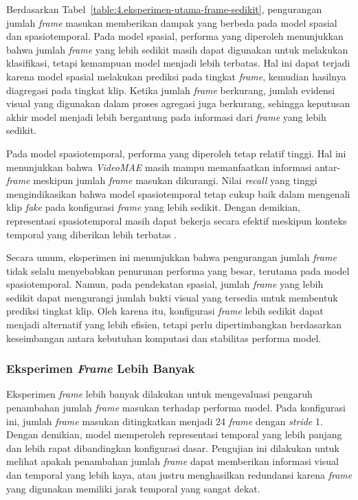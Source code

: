 Berdasarkan Tabel~\ref{table:4.eksperimen-utama-frame-sedikit}, pengurangan jumlah \textit{frame} masukan memberikan dampak yang berbeda pada model spasial dan spasiotemporal. Pada model spasial, performa yang diperoleh menunjukkan bahwa jumlah \textit{frame} yang lebih sedikit masih dapat digunakan untuk melakukan klasifikasi, tetapi kemampuan model menjadi lebih terbatas. Hal ini dapat terjadi karena model spasial melakukan prediksi pada tingkat \textit{frame}, kemudian hasilnya diagregasi pada tingkat klip. Ketika jumlah \textit{frame} berkurang, jumlah evidensi visual yang digunakan dalam proses agregasi juga berkurang, sehingga keputusan akhir model menjadi lebih bergantung pada informasi dari \textit{frame} yang lebih sedikit.

Pada model spasiotemporal, performa yang diperoleh tetap relatif tinggi. Hal ini menunjukkan bahwa \textit{VideoMAE} masih mampu memanfaatkan informasi antar-\textit{frame} meskipun jumlah \textit{frame} masukan dikurangi. Nilai \textit{recall} yang tinggi mengindikasikan bahwa model spasiotemporal tetap cukup baik dalam mengenali klip \textit{fake} pada konfigurasi \textit{frame} yang lebih sedikit. Dengan demikian, representasi spasiotemporal masih dapat bekerja secara efektif meskipun konteks temporal yang diberikan lebih terbatas \cite{Gu2021,tong2022videomaemaskedautoencodersdataefficient}.

Secara umum, eksperimen ini menunjukkan bahwa pengurangan jumlah \textit{frame} tidak selalu menyebabkan penurunan performa yang besar, terutama pada model spasiotemporal. Namun, pada pendekatan spasial, jumlah \textit{frame} yang lebih sedikit dapat mengurangi jumlah bukti visual yang tersedia untuk membentuk prediksi tingkat klip. Oleh karena itu, konfigurasi \textit{frame} lebih sedikit dapat menjadi alternatif yang lebih efisien, tetapi perlu dipertimbangkan berdasarkan keseimbangan antara kebutuhan komputasi dan stabilitas performa model.

\subsubsection{Eksperimen \textit{Frame} Lebih Banyak} \label{IV.Eksperimen_Utama_Frame_Banyak}

Eksperimen \textit{frame} lebih banyak dilakukan untuk mengevaluasi pengaruh penambahan jumlah \textit{frame} masukan terhadap performa model. Pada konfigurasi ini, jumlah \textit{frame} masukan ditingkatkan menjadi 24 \textit{frame} dengan \textit{stride} 1. Dengan demikian, model memperoleh representasi temporal yang lebih panjang dan lebih rapat dibandingkan konfigurasi dasar. Pengujian ini dilakukan untuk melihat apakah penambahan jumlah \textit{frame} dapat memberikan informasi visual dan temporal yang lebih kaya, atau justru menghasilkan redundansi karena \textit{frame} yang digunakan memiliki jarak temporal yang sangat dekat.


